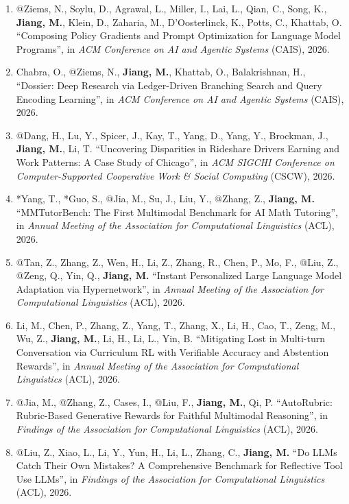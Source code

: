 \documentclass[10pt]{article}
\newenvironment{myindentpar}[1]%
{\begin{list}{}%
         {\setlength{\leftmargin}{#1}}%
         \item[]%
}
{\end{list}}
\newcounter{list}
\begin{document}
\begin{myindentpar}{0.00cm}
\begin{enumerate}[leftmargin=.5cm]
\item[C140] @Ziems, N., Soylu, D., Agrawal, L., Miller, I., Lai, L., Qian, C., Song, K., \textbf{Jiang, M.}, Klein, D., Zaharia, M., D'Oosterlinck, K., Potts, C., Khattab, O. ``Composing Policy Gradients and Prompt Optimization for Language Model Programs'', in \textit{ACM Conference on AI and Agentic Systems} (CAIS), 2026.

\item[C139] Chabra, O., @Ziems, N., \textbf{Jiang, M.}, Khattab, O., Balakrishnan, H., ``Dossier: Deep Research via Ledger-Driven Branching Search and Query Encoding Learning'', in \textit{ACM Conference on AI and Agentic Systems} (CAIS), 2026.

\item[C138] @Dang, H., Lu, Y., Spicer, J., Kay, T., Yang, D., Yang, Y., Brockman, J., \textbf{Jiang, M.}, Li, T. ``Uncovering Disparities in Rideshare Drivers Earning and Work Patterns: A Case Study of Chicago'', in \textit{ACM SIGCHI Conference on Computer-Supported Cooperative Work \& Social Computing} (CSCW), 2026.

\item[C137] *Yang, T., *Guo, S., @Jia, M., Su, J., Liu, Y., @Zhang, Z., \textbf{Jiang, M.} ``MMTutorBench: The First Multimodal Benchmark for AI Math Tutoring'', in \textit{Annual Meeting of the Association for Computational Linguistics} (ACL), 2026.

\item[C136] @Tan, Z., Zhang, Z., Wen, H., Li, Z., Zhang, R., Chen, P., Mo, F., @Liu, Z., @Zeng, Q., Yin, Q., \textbf{Jiang, M.} ``Instant Personalized Large Language Model Adaptation via Hypernetwork'', in \textit{Annual Meeting of the Association for Computational Linguistics} (ACL), 2026.

\item[C135] Li, M., Chen, P., Zhang, Z., Yang, T., Zhang, X., Li, H., Cao, T., Zeng, M., Wu, Z., \textbf{Jiang, M.}, Li, H., Li, L., Yin, B. ``Mitigating Lost in Multi-turn Conversation via Curriculum RL with Verifiable Accuracy and Abstention Rewards'', in \textit{Annual Meeting of the Association for Computational Linguistics} (ACL), 2026.

\item[C134] @Jia, M., @Zhang, Z., Cases, I., @Liu, F., \textbf{Jiang, M.}, Qi, P. ``AutoRubric: Rubric-Based Generative Rewards for Faithful Multimodal Reasoning'', in \textit{Findings of the Association for Computational Linguistics} (ACL), 2026.

\item[C133] @Liu, Z., Xiao, L., Li, Y., Yun, H., Li, L., Zhang, C., \textbf{Jiang, M.} ``Do LLMs Catch Their Own Mistakes? A Comprehensive Benchmark for Reflective Tool Use LLMs'', in \textit{Findings of the Association for Computational Linguistics} (ACL), 2026.


\end{enumerate}
\end{myindentpar}
\end{document}

